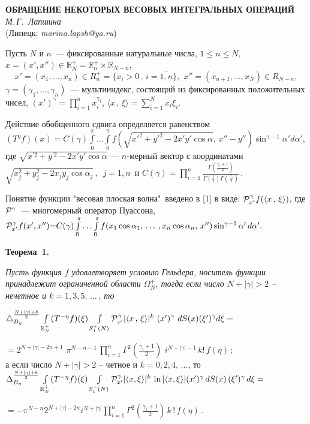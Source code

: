 \begin{center}{
	\bf
	ОБРАЩЕНИЕ НЕКОТОРЫХ ВЕСОВЫХ ИНТЕГРАЛЬНЫХ ОПЕРАЦИЙ
} \\
{\it М.\,Г.~Лапшина } \\
(Липецк; {\it marina.lapsh@ya.ru})
\end{center}


Пусть $N$ и $n$~--- фиксированные натуральные числа, $1\le n\le N $,
$x=(x',x'')\in \mathbb{R}_N^+=\mathbb{R}_n^+\times\mathbb{R}_{N-n}$,
$$x'{=}(x_1,\ldots,x_n)\in R_n^+{=}\{x_i{>}0\,,\, i{=}\overline{1,n}\},\,\,
x''{=}(x_{n+1},\ldots,x_N)\in R_{N{-}n},$$
$\gamma{=}(\gamma_1,\ldots,\gamma_n)$~--- мультииндекс, состоящий из
фиксированных положительных чисел, $(x')^\gamma=\prod_{i=1}^n x_i^{\gamma_i}$,
$\langle x\,,\,\xi\rangle{=}\sum_{i=1}^{N}x_i\xi_i$.

Действие обобщенного сдвига определяется  равенством\\
$
(T^y f)(x){=}C(\gamma)\int\limits_{0}^{\pi}
\ldots \int\limits_{0}^{\pi}
f\left(\sqrt{x'^2{+}y'^2{-}2x'y'\cos\alpha},\,
 x''{-}y''\right)\sin^{\gamma-1}\alpha' d\alpha',
$ \\
где $\sqrt{x^{'2}+y^{'2}-2x'y'\cos\alpha}$ --- $n$-мерный вектор  с координатами\\
$\sqrt{x_j^{2}+y_j^{2}-2x_jy_j\cos\alpha_j}\,,\,\,\, j=\overline{1,n}$\, и
$
C(\gamma)=\prod\limits_{i=1}^n\frac{\Gamma\left(\frac{\gamma_i+1}{2}\right)}
{\Gamma\left(\frac{1}{2}\right)\Gamma\left(\frac{\gamma_i}{2}\right)}\,.
$

Понятие функции "весовая плоская волна"\, введено в [1] в виде:
${\cal P}^\gamma_{x'} f(\langle x\,,\,\xi\rangle)$,
где ${\cal P}^\gamma$~--- многомерный оператор Пуассона,\\
$
{\cal P}^\gamma_{x'} f(x',x''){=}C(\gamma)
\int\limits_0^\pi\ldots \int\limits_0^\pi f(x_1\cos\alpha_1,\,\ldots\,,x_n\cos\alpha_n,\,x'')
\sin^{\gamma-1}\alpha'\,d\alpha'.
$

\smallskip
\textbf{Теорема~1.}
{\it Пусть функция $f$ удовлетворяет условию Гельдера, носитель функции принадлежит ограниченной области $\Omega_{N}^+$,
тогда если число $N+|\gamma|>2$ -- нечетное и $k=1,3,5,\,\ldots\,$, то

$
\triangle_{B_{\eta}}^{\frac{N+|\gamma|+k}{2}}
\int\limits_{\mathbb{R}_N^+}(T^{-\eta}f)(\xi)
\int\limits_{S^+_1(N)}{\cal P}_{x'}^\gamma |\langle x\,,\,\xi\rangle|^k\,\,
(x')^\gamma\,\,dS(x)(\xi')^{\gamma} d\xi=
$

$
=2^{N+|\gamma|-2n+1}\,\,
\pi^{N-n-1}\,
\prod\limits_{i=1}^{n}\Gamma^2\left(\frac{\gamma_i+1}{2}\right)
\,\,i^{N+|\gamma|-1}\,k!
\, f(\eta)\,;
$\\
а если
число $N+|\gamma|>2$ -- четное и $k=0,2,4,\,\ldots$, то\\
$
\Delta_{B_{\eta}}^{\frac{N+|\gamma|+k}{2}}\int\limits_{\mathbb{R}_N^+}(T^{-\eta}f)(\xi)
\int\limits_{S_1^+(N)}{\cal P}_{x'}^\gamma |\langle x,\xi \rangle|^k\,\ln|\langle x,\xi \rangle|
(x')^{\gamma}\,dS(x)\,(\xi')^{\gamma}\,d\xi=
$

$
=-\pi^{N-n} 2^{N+|\gamma|-2n} i^{N+|\gamma|}
\prod\limits_{i=1}^{n}\Gamma^2\left(\frac{\gamma_i+1}{2}\right)\,k\,!\,f(\eta)\,.
$}

